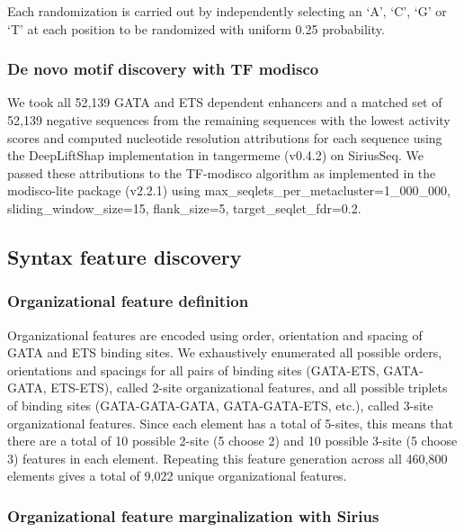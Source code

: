 Each randomization is carried out by independently selecting an ‘A’, ‘C’, ‘G’ or ‘T’ at each position to be randomized with uniform 0.25 probability.

\subsubsection{De novo motif discovery with TF modisco}

We took all 52,139 GATA and ETS dependent enhancers and a matched set of 52,139 negative sequences from the remaining sequences with the lowest activity scores and computed nucleotide resolution attributions for each sequence using the DeepLiftShap implementation in tangermeme (v0.4.2) on SiriusSeq. We passed these attributions to the TF-modisco algorithm as implemented in the modisco-lite package (v2.2.1) using max\_seqlets\_per\_metacluster=1\_000\_000, sliding\_window\_size=15, flank\_size=5, target\_seqlet\_fdr=0.2.

\subsection{Syntax feature discovery}

\subsubsection{Organizational feature definition}

Organizational features are encoded using order, orientation and spacing of GATA and ETS binding sites. We exhaustively enumerated all possible orders, orientations and spacings for all pairs of binding sites (GATA-ETS, GATA-GATA, ETS-ETS), called 2-site organizational features, and all possible triplets of binding sites (GATA-GATA-GATA, GATA-GATA-ETS, etc.), called 3-site organizational features. Since each element has a total of 5-sites, this means that there are a total of 10 possible 2-site (5 choose 2) and 10 possible 3-site (5 choose 3) features in each element. Repeating this feature generation across all 460,800 elements gives a total of 9,022 unique organizational features.

\subsubsection{Organizational feature marginalization with Sirius}

